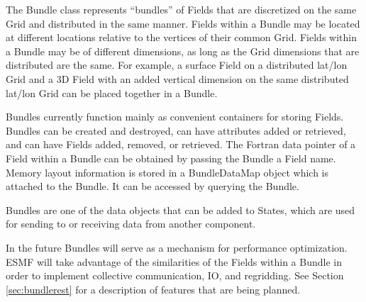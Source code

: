 
The Bundle class represents ``bundles'' of Fields that are 
discretized on the same Grid and distributed in the same manner.  
Fields within a Bundle may be located at different locations relative 
to the vertices of their common Grid.  Fields within a Bundle may
be of different dimensions, as long as the Grid dimensions that 
are distributed are the same.  For example, a surface Field on 
a distributed lat/lon Grid and a 3D Field with an added vertical 
dimension on the same distributed lat/lon Grid can be placed together
in a Bundle.
 
Bundles currently function mainly as convenient containers for storing 
Fields.  Bundles can be created and destroyed, can have attributes 
added or retrieved, and can have Fields added, removed, or retrieved.  
The Fortran data pointer of a Field within a Bundle can be obtained 
by passing the Bundle a Field name.  Memory layout information is 
stored in a BundleDataMap object which is attached to the Bundle.  It 
can be accessed by querying the Bundle.

Bundles are one of the data objects that can be added to States,
which are used for sending to or receiving data from another 
component.

In the future Bundles will serve as a mechanism for performance
optimization.  ESMF will take advantage of the similarities of the
Fields within a Bundle in order to implement collective communication,
IO, and regridding.  See Section \ref{sec:bundlerest} for a 
description of features that are being planned.






